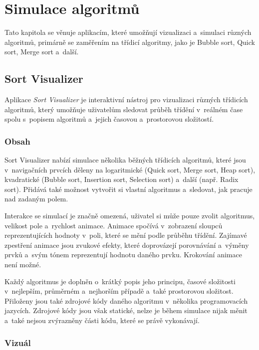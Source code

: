 \pagebreak
\section{Simulace algoritmů}
\label{sec:other_apps_sorting_algorithms}

Tato kapitola se věnuje aplikacím, které umožňují vizualizaci a~simulaci různých algoritmů, primárně se zaměřením na třídicí algoritmy, jako je Bubble sort, Quick sort, Merge sort a~další.

\subsection{Sort Visualizer}
\label{subsec:other_apps_sa_sort_visualizer}

Aplikace \textit{Sort Visualizer} je interaktivní nástroj pro vizualizaci různých třídicích algoritmů, který umožňuje uživatelům sledovat průběh třídění v~reálném čase spolu s~popisem algoritmů a~jejich časovou a~prostorovou složitostí.~\cite{sortVisualizer}

\subsubsection*{Obsah}

Sort Visualizer nabízí simulace několika běžných třídicích algoritmů, které jsou v~navigačních prvcích děleny na logaritmické (Quick sort, Merge sort, Heap sort), kvadratické (Bubble sort, Insertion sort, Selection sort) a~další (např. Radix sort).
Přidává také možnost vytvořit si vlastní algoritmus a~sledovat, jak pracuje nad zadaným polem.

Interakce se simulací je značně omezená, uživatel si může pouze zvolit algoritmus, velikost pole a~rychlost animace.
Animace spočívá v~zobrazení sloupců reprezentujících hodnoty v~poli, které se mění podle průběhu třídění.
Zajímavé zpestření animace jsou zvukové efekty, které doprovázejí porovnávání a~výměny prvků a~svým tónem reprezentují hodnotu daného prvku.
Krokování animace není možné.

Každý algoritmus je doplněn o~krátký popis jeho principu, časové složitosti v~nejlepším, průměrném a~nejhorším případě a~také prostorovou složitost.
Přiloženy jsou také zdrojové kódy daného algoritmu v~několika programovacích jazycích.
Zdrojové kódy jsou však statické, nelze je během simulace nijak měnit a~také nejsou zvýrazněny části kódu, které se právě vykonávají.

\subsubsection*{Vizuál}

